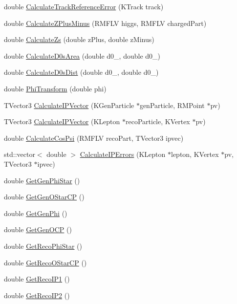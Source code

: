 \begin{DoxyCompactItemize}
\item 
double \hyperlink{classCPQuantities_a75ee8a45a17843c7bff05190732a7bb4}{CalculateTrackReferenceError} (KTrack track)
\item 
double \hyperlink{classCPQuantities_a7bdaec07de8627dd1424946e7776768c}{CalculateZPlusMinus} (RMFLV higgs, RMFLV chargedPart)
\item 
double \hyperlink{classCPQuantities_a30852bb8fd044b8b6c979150aa1c5e84}{CalculateZs} (double zPlus, double zMinus)
\item 
double \hyperlink{classCPQuantities_a03e5be1168d4cea8c65b74640570cc0c}{CalculateD0sArea} (double d0\_, double d0\_)
\item 
double \hyperlink{classCPQuantities_ae45f7a1f234b3a6bff9d6afeeb769a16}{CalculateD0sDist} (double d0\_, double d0\_)
\item 
double \hyperlink{classCPQuantities_a5e9cd0d191719349777eb5d8b5bc919c}{PhiTransform} (double phi)
\item 
TVector3 \hyperlink{classCPQuantities_a6d5ba56501e2c1c35da35309af81b112}{CalculateIPVector} (KGenParticle $\ast$genParticle, RMPoint $\ast$pv)
\item 
TVector3 \hyperlink{classCPQuantities_a7cba8aa116e58892d0ecca846e8b8f08}{CalculateIPVector} (KLepton $\ast$recoParticle, KVertex $\ast$pv)
\item 
double \hyperlink{classCPQuantities_a115b55637b473bdab3941eadb1cf5b55}{CalculateCosPsi} (RMFLV recoPart, TVector3 ipvec)
\item 
std::vector$<$ double $>$ \hyperlink{classCPQuantities_a692317cc0e1ca420fda665230c58b5b6}{CalculateIPErrors} (KLepton $\ast$lepton, KVertex $\ast$pv, TVector3 $\ast$ipvec)
\item 
double \hyperlink{classCPQuantities_aa267b9a3948b963ea9cbb7a5542ba900}{GetGenPhiStar} ()
\item 
double \hyperlink{classCPQuantities_a2697905dce575b8d56a83e24367cb8b9}{GetGenOStarCP} ()
\item 
double \hyperlink{classCPQuantities_a705bbd0a4e63114d14651656001adff1}{GetGenPhi} ()
\item 
double \hyperlink{classCPQuantities_a39840af1718044f5c19a0dbd42d314e7}{GetGenOCP} ()
\item 
double \hyperlink{classCPQuantities_a778283bd3af9c19d9498d9763d0facb5}{GetRecoPhiStar} ()
\item 
double \hyperlink{classCPQuantities_aa84d24d23086f4ecb1f144180ab3adca}{GetRecoOStarCP} ()
\item 
double \hyperlink{classCPQuantities_a00be036cdc2d8c9ed21ea6a70cee56f0}{GetRecoIP1} ()
\item 
double \hyperlink{classCPQuantities_a2045f55f5ee2cde785b01464b3fe822a}{GetRecoIP2} ()
\end{DoxyCompactItemize}



